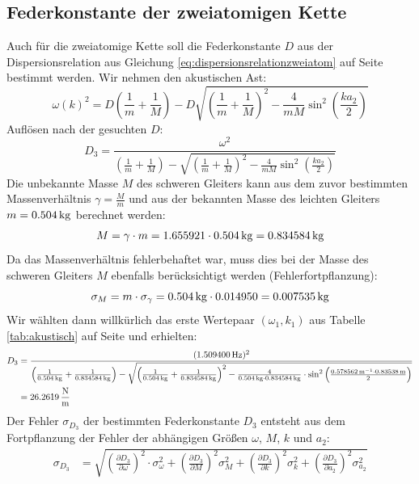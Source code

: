 \documentclass[a4paper,titlepage]{scrartcl}
\numberwithin{equation}{section}
\begin{document}
\subsection{Federkonstante der zweiatomigen Kette}
Auch für die zweiatomige Kette soll die Federkonstante $D$ aus der Dispersionsrelation aus Gleichung \ref{eq:dispersionsrelationzweiatom} auf Seite \pageref{eq:dispersionsrelationzweiatom} bestimmt werden. Wir nehmen den akustischen Ast:
\begin{equation*}
\omega(k)^2=D \left( \frac{1}{m} + \frac{1}{M} \right) - D \sqrt{\left( \frac{1}{m} + \frac{1}{M} \right)^2 - \frac{4}{m M} \sin^2{\left( \frac{ka_2}{2} \right)}}
\end{equation*}
Auflösen nach der gesuchten $D$:
\begin{equation*}
D_3=\frac{\omega^2}{\left( \frac{1}{m} + \frac{1}{M} \right) - \sqrt{\left( \frac{1}{m} + \frac{1}{M} \right)^2 - \frac{4}{mM} \sin^2{\left( \frac{ka_2}{2} \right)}}}
\end{equation*}
Die unbekannte Masse $M$ des schweren Gleiters kann aus dem zuvor bestimmten Massenverhältnis $\gamma=\frac{M}{m}$ und aus der bekannten Masse des leichten Gleiters $m=\unit[0.504]{kg}$ berechnet werden:
\begin{equation*}
M=\gamma \cdot m = 1.655921 \cdot \unit[0.504]{kg}=\unit[0.834584]{kg}
\end{equation*}
Da das Massenverhältnis fehlerbehaftet war, muss dies bei der Masse des schweren Gleiters $M$ ebenfalls berücksichtigt werden (Fehlerfortpflanzung):
\begin{equation*}
\sigma_M=m \cdot \sigma_{\gamma}=\unit[0.504]{kg} \cdot 0.014950=\unit[0.007535]{kg}
\end{equation*}
Wir wählten dann willkürlich das erste Wertepaar $(\omega_1,k_1)$ aus Tabelle \ref{tab:akustisch} auf Seite \pageref{tab:akustisch} und erhielten:
\begin{align*}
D_3&=\frac{(\unit[1.509400]{Hz})^2}{\left( \frac{1}{\unit[0.504]{kg}} + \frac{1}{\unit[0.834584]{kg}} \right) - \sqrt{\left( \frac{1}{\unit[0.504]{kg}} + \frac{1}{\unit[0.834584]{kg}} \right)^2 - \frac{4}{\unit[0.504]{kg} \cdot \unit[0.834584]{kg}} \cdot \sin^2{\left( \frac{\unit[0.578562]{m^{-1}} \cdot \unit[0.83538]{m}}{2} \right)}}}\\
&=\unit[26.2619]{\frac{N}{m}}
\end{align*}
Der Fehler $\sigma_{D_3}$ der bestimmten Federkonstante $D_3$ entsteht aus dem Fortpflanzung der Fehler der abhängigen Größen $\omega$, $M$, $k$ und $a_2$:
\begin{align*}
\sigma_{D_3}&=\sqrt{\left( \frac{\partial D_3}{\partial \omega} \right)^2 \cdot \sigma^2_{\omega} + \left( \frac{\partial D_3}{\partial M} \right)^2 \sigma^2_M + \left( \frac{\partial D_3}{\partial k} \right)^2 \sigma^2_k + \left( \frac{\partial D_3}{\partial a_2} \right)^2 \sigma^2_{a_2}}\\
\end{align*}
\end{document}
